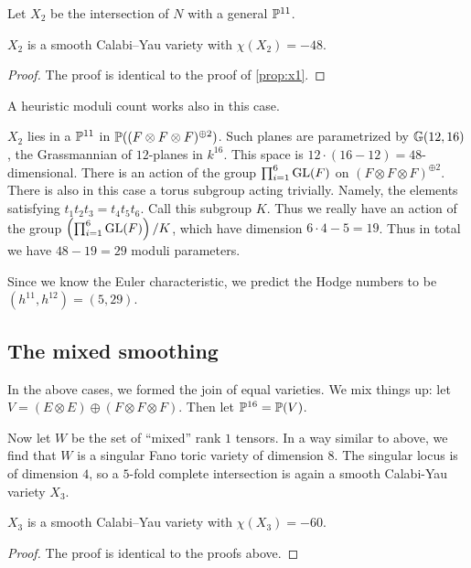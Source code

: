 Let $X_2$ be the intersection of $N$ with a general $\P^{11}$.

\begin{proposition}
\label{prop:x2}
$X_2$ is a smooth Calabi--Yau variety with $\chi(X_2)=-48$.
\end{proposition}
\begin{proof}
The proof is identical to the proof of \cref{prop:x1}.
\end{proof}

\begin{remark}
A heuristic moduli count works also in this case.

$X_2$ lies in a $\P^{11}$ in $\P((F \otimes F \otimes F)^{\oplus 2})$. Such planes are parametrized by $\Gr(12,16)$, the Grassmannian of $12$-planes in $k^{16}$. This space is $12 \cdot (16-12)=48$-dimensional. There is an action of the group $\prod_{i=1}^6 \GL(F)$ on $(F \otimes F \otimes F)^{\oplus 2}$. There is also in this case a torus subgroup acting trivially. Namely, the elements satisfying $t_1t_2t_3=t_4t_5t_6$. Call this subgroup $K$. Thus we really have an action of the group $\left(\prod_{i=1}^6 \GL(F)\right)/K$, which have dimension $6 \cdot 4 - 5 = 19$. Thus in total we have $48-19=29$ moduli parameters.

Since we know the Euler characteristic, we predict the Hodge numbers to be $(h^{11},h^{12})=(5,29)$.
\end{remark}

\subsection{The mixed smoothing}

In the above cases, we formed the join of equal varieties. We mix things up: let $V=(E \otimes E) \oplus (F \otimes F \otimes F)$. Then let $\P^{16}=\P(V)$.

Now let $W$ be the set of ``mixed'' rank $1$ tensors. In a way similar to above, we find that $W$ is a singular Fano toric variety of dimension $8$. The singular locus is of dimension $4$, so a $5$-fold complete intersection is again a smooth Calabi-Yau variety $X_3$.

\begin{proposition}
\label{prop:x3}
$X_3$ is a smooth Calabi--Yau variety with $\chi(X_3)=-60$.
\end{proposition}
\begin{proof}
The proof is identical to the proofs above.
\end{proof}

